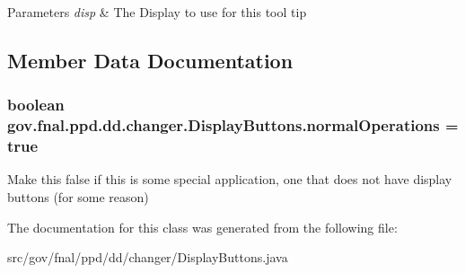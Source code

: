 \begin{DoxyParams}{Parameters}
{\em disp} & The Display to use for this tool tip \\
\hline
\end{DoxyParams}


\subsection{Member Data Documentation}
\hypertarget{classgov_1_1fnal_1_1ppd_1_1dd_1_1changer_1_1DisplayButtons_aee30976132133400c5f8cb6a48599aa9}{
\subsubsection[{normal\-Operations}]{\setlength{\rightskip}{0pt plus 5cm}boolean gov.\-fnal.\-ppd.\-dd.\-changer.\-Display\-Buttons.\-normal\-Operations = true\hspace{0.3cm}{\ttfamily [static]}}}\label{classgov_1_1fnal_1_1ppd_1_1dd_1_1changer_1_1DisplayButtons_aee30976132133400c5f8cb6a48599aa9}
Make this false if this is some special application, one that does not have display buttons (for some reason) 

The documentation for this class was generated from the following file\-:\begin{DoxyCompactItemize}
\item 
src/gov/fnal/ppd/dd/changer/Display\-Buttons.\-java\end{DoxyCompactItemize}

